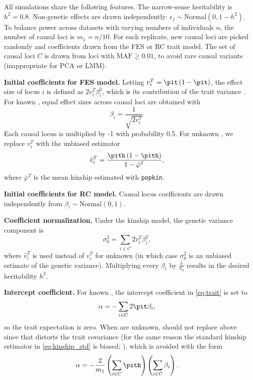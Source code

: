 \documentclass[11pt]{article}
\begin{document}
All simulations share the following features.
The narrow-sense heritability is $h^2 = 0.8$.
Non-genetic effects are drawn independently: $\epsilon_j \sim \text{Normal}(0, 1 - h^2 )$.
To balance power across datasets with varying numbers of individuals $n$, the number of causal loci is $m_1 = n / 10$.
For each replicate, new causal loci are picked randomly and coefficients drawn from the FES or RC trait model.
The set of causal loci $C$ is drawn from loci with $\text{MAF} \ge 0.01$, to avoid rare causal variants (inappropriate for PCA or LMM).

\textbf{Initial coefficients for FES model.}
Letting $v_i^T = \pit \left( 1 - \pit \right)$, the effect size of locus $i$ is defined as $2 v_i^T \beta_i^2$, which is its contribution of the trait variance \citep{park_estimation_2010}.
For known \pit, equal effect sizes across causal loci are obtained with
$$
\beta_i = \frac{1}{ \sqrt{ 2 v_i^T } }.
$$
Each causal locus is multiplied by -1 with probability 0.5.
For unknown \pit, we replace $v_i^T$ with the unbiased estimator \citep{ochoa_estimating_2021}
\begin{equation*}
  \hat{v}_i^T
  =
  \frac{ \pith \left( 1 - \pith \right) }{ 1 - \bar{\varphi}^T } 
  ,
\end{equation*}
where $\bar{\varphi}^T$ is the mean kinship estimated with \texttt{popkin}.

\textbf{Initial coefficients for RC model.}
Causal locus coefficients are drawn independently from $\beta_i \sim \text{Normal}( 0, 1 )$.

\textbf{Coefficient normalization.}
Under the kinship model, the genetic variance component is
$$
\sigma^2_0
=
\sum_{i \in C} 2 v_i^T \beta_i^2 ,
$$
where $\hat{v}_i^T$ is used instead of $v_i^T$ for unknown \pit (in which case $\sigma^2_0$ is an unbiased estimate of the genetic variance).
Multiplying every $\beta_i$ by $\frac{h}{ \sigma_0 }$ results in the desired heritability $h^2$.

\textbf{Intercept coefficient.}
For known \pit, the intercept coefficient in \cref{eq:trait} is set to
$$
\alpha = - \sum_{i \in C} 2 \pit \beta_i,
$$
so the trait expectation is zero.
When \pit are unknown, \pith should not replace \pit above since that distorts the trait covariance (for the same reason the standard kinship estimator in \cref{eq:kinship_std} is biased; \cite{ochoa_estimating_2021}), which is avoided with the form
$$
\alpha = - \frac{2}{m_1} \left( \sum_{i \in C} \pith \right) \left(\sum_{i \in C} \beta_i \right).
$$
\end{document}
